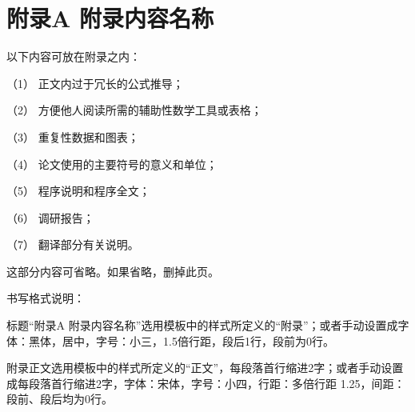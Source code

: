 \documentclass[UTF8,a4paper]{ctexart}
\numberwithin{table}{section}
\numberwithin{equation}{section}
\begin{document}
	\section*{\fontsize{15}{22.5} {\heiti 附录A \quad 附录内容名称}}
	以下内容可放在附录之内：\par 
	（1） 正文内过于冗长的公式推导；\par 
	（2） 方便他人阅读所需的辅助性数学工具或表格；\par 
	（3） 重复性数据和图表；\par 
	（4） 论文使用的主要符号的意义和单位；\par 
	（5） 程序说明和程序全文；\par 
	（6） 调研报告；\par 
	（7） 翻译部分有关说明。\par 
	这部分内容可省略。如果省略，删掉此页。\par 
	书写格式说明：\par 
	标题“附录A 附录内容名称”选用模板中的样式所定义的“附录”；或者手动设置成字体：黑体，居中，字号：小三，1.5倍行距，段后1行，段前为0行。\par 
	附录正文选用模板中的样式所定义的“正文”，每段落首行缩进2字；或者手动设置成每段落首行缩进2字，字体：宋体，字号：小四，行距：多倍行距 1.25，间距：段前、段后均为0行。
	
	\newpage
\end{document}
